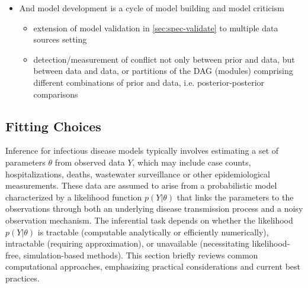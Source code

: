 \documentclass{article}
\begin{document}
\begin{itemize}
    \item And model development is a cycle of model building and model criticism
    \begin{itemize}
        \item extension of model validation in \ref{sec:spec-validate} to multiple data sources setting
        \item detection/measurement of conflict not only between prior and data, but between data and data, or partitions of the DAG (modules) comprising different combinations of prior and data, i.e. posterior-posterior comparisons
    \end{itemize}
\end{itemize}


\subsection{Fitting Choices}\label{sec:fitting}

Inference for infectious disease models typically involves estimating a set of parameters $\theta$ from observed data $Y$, which may include case counts, hospitalizations, deaths, wastewater surveillance or other epidemiological measurements. These data are assumed to arise from a probabilistic model characterized by a likelihood function $p(Y | \theta)$ that links the parameters to the observations through both an underlying disease transmission process and a noisy observation mechanism.  The inferential task depends on whether the likelihood $ p(Y | \theta)$ is tractable (computable analytically or efficiently numerically), intractable (requiring approximation), or unavailable (necessitating likelihood-free, simulation-based methods). This section briefly reviews common computational approaches, emphasizing practical considerations and current best practices. 
\end{document}
